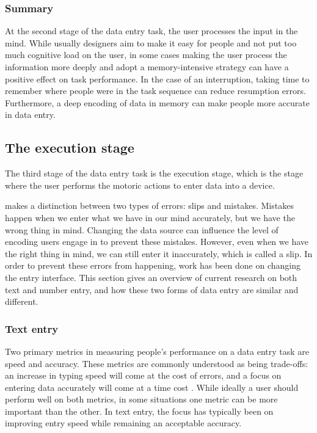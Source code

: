 \documentclass[11pt,oneside]{report}
\begin{document}
\subsubsection{Summary}
At the second stage of the data entry task, the user processes the input in the mind. While usually designers aim to make it easy for people and not put too much cognitive load on the user, in some cases making the user process the information more deeply and adopt a memory-intensive strategy can have a positive effect on task performance. In the case of an interruption, taking time to remember where people were in the task sequence can reduce resumption errors. Furthermore, a deep encoding of data in memory can make people more accurate in data entry.

\subsection{The execution stage}
The third stage of the data entry task is the execution stage, which is the stage where the user performs the motoric actions to enter data into a device.

\citet{Reason1990} makes a distinction between two types of errors: slips and mistakes. Mistakes happen when we enter what we have in our mind accurately, but we have the wrong thing in mind. Changing the data source can influence the level of encoding users engage in to prevent these mistakes. However, even when we have the right thing in mind, we can still enter it inaccurately, which is called a slip. In order to prevent these errors from happening, work has been done on changing the entry interface. This section gives an overview of current research on both text and number entry, and how these two forms of data entry are similar and different.

\subsubsection{Text entry}
Two primary metrics in measuring people's performance on a data entry task are speed and accuracy. These metrics are commonly understood as being trade-offs: an increase in typing speed will come at the cost of errors, and a focus on entering data accurately will come at a time cost \citep{MacKenzie2002, Smith2008}.  While ideally a user should perform well on both metrics, in some situations one metric can be more important than the other. In text entry, the focus has typically been on improving entry speed while remaining an acceptable accuracy.
\end{document}

